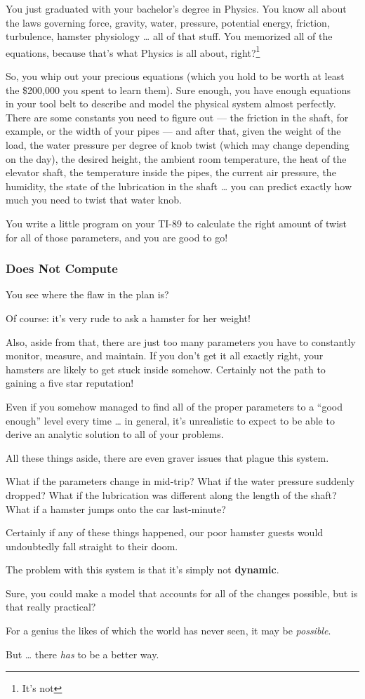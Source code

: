 \documentclass[]{article}
\begin{document}
You just graduated with your bachelor's degree in Physics. You know all
about the laws governing force, gravity, water, pressure, potential
energy, friction, turbulence, hamster physiology \ldots{} all of that
stuff. You memorized all of the equations, because that's what Physics
is all about, right?\footnote{It's not}

So, you whip out your precious equations (which you hold to be worth at
least the \$200,000 you spent to learn them). Sure enough, you have
enough equations in your tool belt to describe and model the physical
system almost perfectly. There are some constants you need to figure out
--- the friction in the shaft, for example, or the width of your pipes
--- and after that, given the weight of the load, the water pressure per
degree of knob twist (which may change depending on the day), the
desired height, the ambient room temperature, the heat of the elevator
shaft, the temperature inside the pipes, the current air pressure, the
humidity, the state of the lubrication in the shaft \ldots{} you can
predict exactly how much you need to twist that water knob.

You write a little program on your TI-89 to calculate the right amount
of twist for all of those parameters, and you are good to go!

\subsubsection{Does Not Compute}\label{does-not-compute}

You see where the flaw in the plan is?

Of course: it's very rude to ask a hamster for her weight!

Also, aside from that, there are just too many parameters you have to
constantly monitor, measure, and maintain. If you don't get it all
exactly right, your hamsters are likely to get stuck inside somehow.
Certainly not the path to gaining a five star reputation!

Even if you somehow managed to find all of the proper parameters to a
``good enough'' level every time \ldots{} in general, it's unrealistic
to expect to be able to derive an analytic solution to all of your
problems.

All these things aside, there are even graver issues that plague this
system.

What if the parameters change in mid-trip? What if the water pressure
suddenly dropped? What if the lubrication was different along the length
of the shaft? What if a hamster jumps onto the car last-minute?

Certainly if any of these things happened, our poor hamster guests would
undoubtedly fall straight to their doom.

The problem with this system is that it's simply not \textbf{dynamic}.

Sure, you could make a model that accounts for all of the changes
possible, but is that really practical?

For a genius the likes of which the world has never seen, it may be
\emph{possible}.

But \ldots{} there \emph{has} to be a better way.
\end{document}
